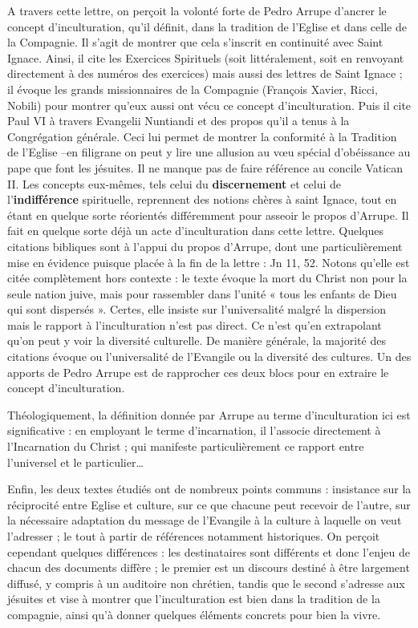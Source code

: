 A travers cette lettre, on perçoit la volonté forte de Pedro Arrupe d’ancrer le concept d’inculturation, qu’il définit, dans la tradition de l’Eglise et dans celle de la Compagnie. Il s’agit de montrer que cela s’inscrit en continuité avec Saint Ignace. Ainsi, il cite les Exercices Spirituels (soit littéralement, soit en renvoyant directement à des numéros des exercices) mais aussi des lettres de Saint Ignace ; il évoque les grands missionnaires de la Compagnie (François Xavier, Ricci, Nobili) pour montrer qu’eux aussi ont vécu ce concept d’inculturation. Puis il cite Paul VI à travers Evangelii Nuntiandi et des propos qu’il a tenus à la Congrégation générale. Ceci lui permet de montrer la conformité à la Tradition de l’Eglise –en filigrane on peut y lire une allusion au vœu spécial d’obéissance au pape que font les jésuites. Il ne manque pas de faire référence au concile Vatican II. Les concepts eux-mêmes, tels celui du \textbf{discernement} et celui de l’\textbf{indifférence} spirituelle, reprennent des notions chères à saint Ignace, tout en étant en quelque sorte réorientés différemment pour asseoir le propos d’Arrupe. Il fait en quelque sorte déjà un acte d’inculturation dans cette lettre.
Quelques citations bibliques sont à l’appui du propos d’Arrupe, dont une particulièrement mise en évidence puisque placée à la fin de la lettre : Jn 11, 52. Notons qu’elle est citée complètement hors contexte : le texte évoque la mort du Christ non pour la seule nation juive, mais pour rassembler dans l’unité « tous les enfants de Dieu qui sont dispersés ». Certes, elle insiste sur l’universalité malgré la dispersion mais le rapport à l’inculturation n’est pas direct. Ce n’est qu’en extrapolant qu’on peut y voir la diversité culturelle. De manière générale, la majorité des citations évoque ou l’universalité de l’Evangile ou la diversité des cultures. Un des apports de Pedro Arrupe est de rapprocher ces deux blocs pour en extraire le concept d’inculturation.
\begin{Prop}
  Théologiquement, la définition donnée par Arrupe au terme d’inculturation ici est significative : en employant le terme d’incarnation, il l’associe directement à l’Incarnation du Christ ; qui manifeste particulièrement ce rapport entre l’universel et le particulier…  
\end{Prop}

Enfin, les deux textes étudiés ont de nombreux points communs : insistance sur la réciprocité entre Eglise et culture, sur ce que chacune peut recevoir de l’autre, sur la nécessaire adaptation du message de l’Evangile à la culture à laquelle on veut l’adresser ; le tout à partir de références notamment historiques. On perçoit cependant quelques différences : les destinataires sont différents et donc l’enjeu de chacun des documents diffère ; le premier est un discours destiné à être largement diffusé, y compris à un auditoire non chrétien, tandis que le second s’adresse aux jésuites et vise à montrer que l’inculturation est bien dans la tradition de la compagnie, ainsi qu’à donner quelques éléments concrets pour bien la vivre.


